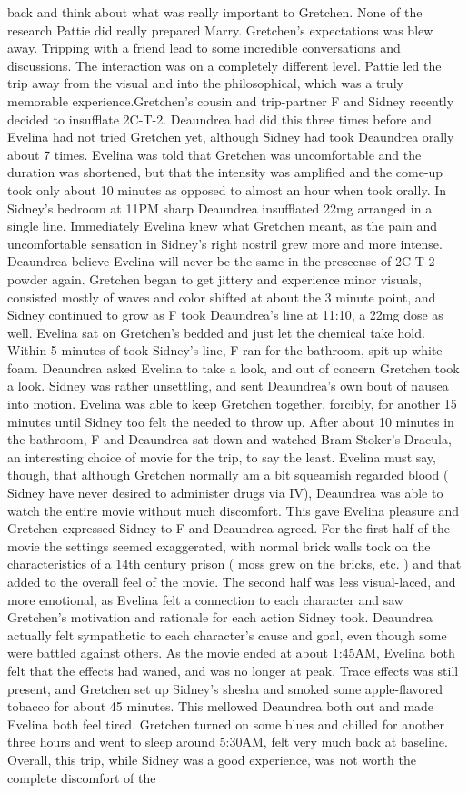 \documentclass[12pt]{book}
\begin{document}
back and think about what was really important to Gretchen. None of the research Pattie did really prepared Marry. Gretchen's expectations was blew away. Tripping with a friend lead to some incredible conversations and discussions. The interaction was on a completely different level. Pattie led the trip away from the visual and into the philosophical, which was a truly memorable experience.Gretchen's cousin and trip-partner F and Sidney recently decided to insufflate 2C-T-2. Deaundrea had did this three times before and Evelina had not tried Gretchen yet, although Sidney had took Deaundrea orally about 7 times. Evelina was told that Gretchen was uncomfortable and the duration was shortened, but that the intensity was amplified and the come-up took only about 10 minutes as opposed to almost an hour when took orally. In Sidney's bedroom at 11PM sharp Deaundrea insufflated 22mg arranged in a single line. Immediately Evelina knew what Gretchen meant, as the pain and uncomfortable sensation in Sidney's right nostril grew more and more intense. Deaundrea believe Evelina will never be the same in the prescense of 2C-T-2 powder again. Gretchen began to get jittery and experience minor visuals, consisted mostly of waves and color shifted at about the 3 minute point, and Sidney continued to grow as F took Deaundrea's line at 11:10, a 22mg dose as well. Evelina sat on Gretchen's bedded and just let the chemical take hold. Within 5 minutes of took Sidney's line, F ran for the bathroom, spit up white foam. Deaundrea asked Evelina to take a look, and out of concern Gretchen took a look. Sidney was rather unsettling, and sent Deaundrea's own bout of nausea into motion. Evelina was able to keep Gretchen together, forcibly, for another 15 minutes until Sidney too felt the needed to throw up. After about 10 minutes in the bathroom, F and Deaundrea sat down and watched Bram Stoker's Dracula, an interesting choice of movie for the trip, to say the least. Evelina must say, though, that although Gretchen normally am a bit squeamish regarded blood ( Sidney have never desired to administer drugs via IV), Deaundrea was able to watch the entire movie without much discomfort. This gave Evelina pleasure and Gretchen expressed Sidney to F and Deaundrea agreed. For the first half of the movie the settings seemed exaggerated, with normal brick walls took on the characteristics of a 14th century prison ( moss grew on the bricks, etc. ) and that added to the overall feel of the movie. The second half was less visual-laced, and more emotional, as Evelina felt a connection to each character and saw Gretchen's motivation and rationale for each action Sidney took. Deaundrea actually felt sympathetic to each character's cause and goal, even though some were battled against others. As the movie ended at about 1:45AM, Evelina both felt that the effects had waned, and was no longer at peak. Trace effects was still present, and Gretchen set up Sidney's shesha and smoked some apple-flavored tobacco for about 45 minutes. This mellowed Deaundrea both out and made Evelina both feel tired. Gretchen turned on some blues and chilled for another three hours and went to sleep around 5:30AM, felt very much back at baseline. Overall, this trip, while Sidney was a good experience, was not worth the complete discomfort of the 
\end{document}
